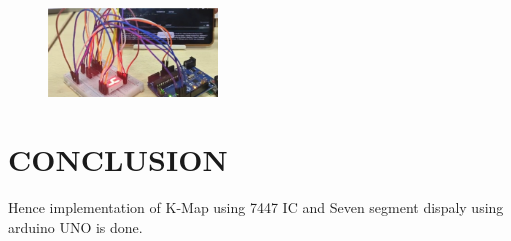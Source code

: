 \documentclass[conference]{IEEEtran}
\begin{document}
\begin{figure}[h]                           
\centering                                 
\includegraphics[width=0.4\textwidth]{h.jpg   }                                           
\caption{\label{fig-5:Gates}}               
\end{figure}

\section{CONCLUSION}
 Hence implementation of K-Map using 7447 IC and Seven segment dispaly using arduino UNO is done.
\end{document}
